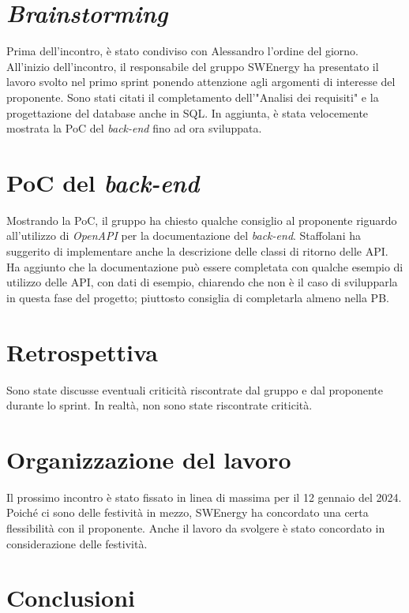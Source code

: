 \section{\textit{Brainstorming}}

Prima dell'incontro, è stato condiviso con Alessandro l'ordine del giorno. 
All'inizio dell'incontro, il
responsabile del gruppo SWEnergy ha presentato il lavoro svolto nel primo
sprint ponendo attenzione agli argomenti di interesse del proponente. Sono stati
citati il completamento dell'"Analisi dei requisiti" e la progettazione del
database anche in SQL. In aggiunta, è stata velocemente mostrata la PoC del
\textit{back-end} fino ad ora sviluppata.

\section{PoC del \textit{back-end}}

Mostrando la PoC, il gruppo ha chiesto qualche consiglio al proponente riguardo
all'utilizzo di \textit{OpenAPI} per la documentazione del \textit{back-end}.
Staffolani ha suggerito di implementare anche la descrizione delle classi di
ritorno delle API. Ha aggiunto che la documentazione può essere completata con
qualche esempio di utilizzo delle API, con dati di esempio, chiarendo che non è
il caso di svilupparla in questa fase del progetto; piuttosto consiglia di
completarla almeno nella PB.

\section{Retrospettiva}

Sono state discusse eventuali criticità riscontrate dal gruppo e dal proponente
durante lo sprint. In realtà, non sono state riscontrate criticità.

\section{Organizzazione del lavoro}

Il prossimo incontro è stato fissato in linea di massima per il 12 gennaio del
2024. Poiché ci sono delle festività in mezzo, SWEnergy ha concordato una certa
flessibilità con il proponente. Anche il lavoro da svolgere è stato concordato
in considerazione delle festività.

\section{Conclusioni}

